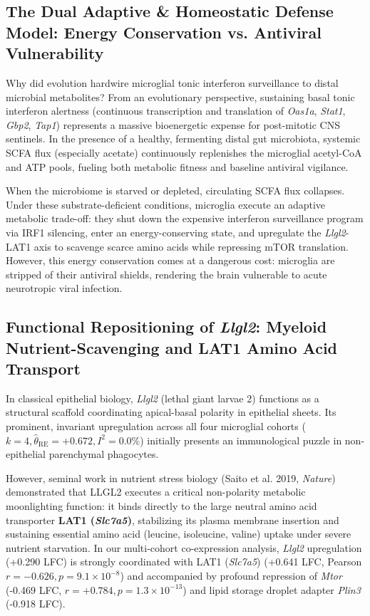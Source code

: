 \documentclass[10pt,a4paper]{article}
\begin{document}
\subsection{The Dual Adaptive \& Homeostatic Defense Model: Energy Conservation vs. Antiviral Vulnerability}
Why did evolution hardwire microglial tonic interferon surveillance to distal microbial metabolites? From an evolutionary perspective, sustaining basal tonic interferon alertness (continuous transcription and translation of \textit{Oas1a}, \textit{Stat1}, \textit{Gbp2}, \textit{Tap1}) represents a massive bioenergetic expense for post-mitotic CNS sentinels. In the presence of a healthy, fermenting distal gut microbiota, systemic SCFA flux (especially acetate) continuously replenishes the microglial acetyl-CoA and ATP pools, fueling both metabolic fitness and baseline antiviral vigilance\cite{erny2021_8}.

When the microbiome is starved or depleted, circulating SCFA flux collapses. Under these substrate-deficient conditions, microglia execute an adaptive metabolic trade-off: they shut down the expensive interferon surveillance program via IRF1 silencing, enter an energy-conserving state, and upregulate the \textit{Llgl2}-LAT1 axis to scavenge scarce amino acids while repressing mTOR translation. However, this energy conservation comes at a dangerous cost: microglia are stripped of their antiviral shields, rendering the brain vulnerable to acute neurotropic viral infection\cite{brown2019_24,winkler2020_25}.

\subsection{Functional Repositioning of \textit{Llgl2}: Myeloid Nutrient-Scavenging and LAT1 Amino Acid Transport}
In classical epithelial biology, \textit{Llgl2} (lethal giant larvae 2) functions as a structural scaffold coordinating apical-basal polarity in epithelial sheets\cite{bilder2000_27}. Its prominent, invariant upregulation across all four microglial cohorts ($k=4, \hat{\theta}_{\text{RE}} = +0.672, I^2 = 0.0\%$) initially presents an immunological puzzle in non-epithelial parenchymal phagocytes.

However, seminal work in nutrient stress biology (Saito et al. 2019, \textit{Nature})\cite{saito2019_26} demonstrated that LLGL2 executes a critical non-polarity metabolic moonlighting function: it binds directly to the large neutral amino acid transporter \textbf{LAT1 (\textit{Slc7a5})}, stabilizing its plasma membrane insertion and sustaining essential amino acid (leucine, isoleucine, valine) uptake under severe nutrient starvation. In our multi-cohort co-expression analysis, \textit{Llgl2} upregulation (+0.290 LFC) is strongly coordinated with LAT1 (\textit{Slc7a5}) (+0.641 LFC, Pearson $r = -0.626, p = 9.1 \times 10^{-8}$) and accompanied by profound repression of \textit{Mtor} (-0.469 LFC, $r = +0.784, p = 1.3 \times 10^{-13}$) and lipid storage droplet adapter \textit{Plin3} (-0.918 LFC). 
\end{document}
